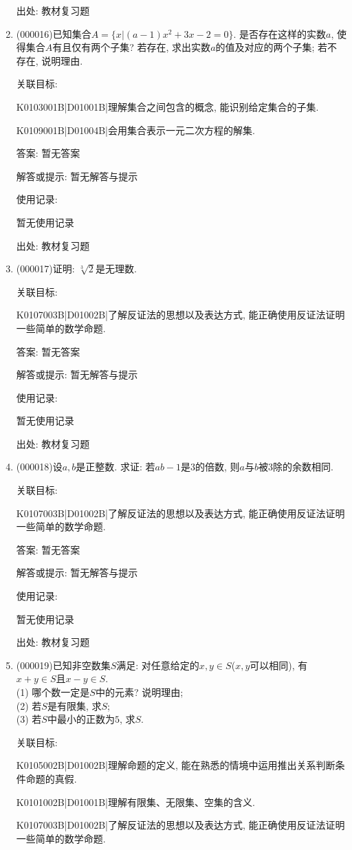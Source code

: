 \documentclass[10pt,a4paper]{article}
\begin{document}
\begin{enumerate}[1.]
出处: 教材复习题
\item { (000016)}已知集合$A=\{x|(a-1)x^2+3x-2=0\}$. 是否存在这样的实数$a$, 使得集合$A$有且仅有两个子集? 若存在, 求出实数$a$的值及对应的两个子集; 若不存在, 说明理由.


关联目标:

K0103001B|D01001B|理解集合之间包含的概念, 能识别给定集合的子集.

K0109001B|D01004B|会用集合表示一元二次方程的解集.

答案: 暂无答案

解答或提示: 暂无解答与提示

使用记录:

暂无使用记录


出处: 教材复习题
\item { (000017)}证明: $\sqrt[3]{2}$是无理数.


关联目标:

K0107003B|D01002B|了解反证法的思想以及表达方式, 能正确使用反证法证明一些简单的数学命题.

答案: 暂无答案

解答或提示: 暂无解答与提示

使用记录:

暂无使用记录


出处: 教材复习题
\item { (000018)}设$a,b$是正整数. 求证: 若$ab-1$是$3$的倍数, 则$a$与$b$被$3$除的余数相同.


关联目标:

K0107003B|D01002B|了解反证法的思想以及表达方式, 能正确使用反证法证明一些简单的数学命题.

答案: 暂无答案

解答或提示: 暂无解答与提示

使用记录:

暂无使用记录


出处: 教材复习题
\item { (000019)}已知非空数集$S$满足: 对任意给定的$x,y\in S$($x,y$可以相同), 有$x+y\in S$且$x-y\in S$.\\
(1) 哪个数一定是$S$中的元素? 说明理由;\\
(2) 若$S$是有限集, 求$S$;\\
(3) 若$S$中最小的正数为$5$, 求$S$.


关联目标:

K0105002B|D01002B|理解命题的定义, 能在熟悉的情境中运用推出关系判断条件命题的真假.

K0101002B|D01001B|理解有限集、无限集、空集的含义.

K0107003B|D01002B|了解反证法的思想以及表达方式, 能正确使用反证法证明一些简单的数学命题.


\end{enumerate}
\end{document}

